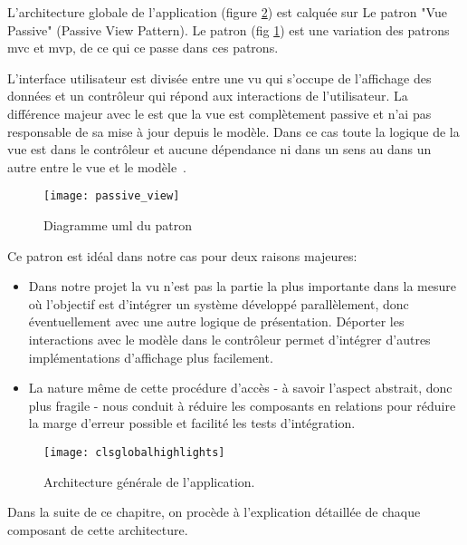 L'architecture globale de l'application (figure \ref{fig:cls_global})
est calquée sur Le patron "Vue Passive" (Passive View Pattern). Le patron
 (fig \ref{fig:passive_view}) est une variation des
patrons \gls{mvc} et \gls{mvp}, de ce qui ce passe dans ces patrons.

L'interface utilisateur est divisée entre une vu qui s'occupe de
l'affichage des données et un contrôleur qui répond aux interactions de
l'utilisateur. La différence majeur avec le  est que la
vue est complètement passive et n'ai pas responsable de sa mise à jour
depuis le modèle. Dans ce cas toute la logique de la vue est dans le
contrôleur et aucune dépendance ni dans un sens au dans un autre entre
le vue et le modèle~\cite{fowler:passive_view}.

\begin{figure}[H]
\center
\texttt{[image: passive\_view]}
\caption{Diagramme \gls{uml} du patron ~\cite{fowler:passive_view}}
\label{fig:passive_view}
\end{figure}

Ce patron est idéal dans notre cas pour deux raisons majeures:

\begin{itemize} 

\item Dans notre projet la vu n'est pas la partie la plus importante
dans la mesure où l'objectif est d'intégrer un système développé
parallèlement, donc éventuellement avec une autre logique de
présentation. Déporter les interactions avec le modèle dans le
contrôleur permet d'intégrer d'autres implémentations d'affichage plus
facilement.

\item La nature même de cette procédure d’accès - à savoir l’aspect
abstrait, donc plus fragile - nous conduit à réduire les composants en
relations pour réduire la marge d'erreur possible et facilité les tests d’intégration.

\end{itemize}

\begin{figure}
\center
\texttt{[image: clsglobalhighlights]}
\caption{Architecture générale de l'application.}
\label{fig:cls_global}
\end{figure}

Dans la suite de ce chapitre, on procède à l'explication détaillée de chaque composant de cette architecture.


